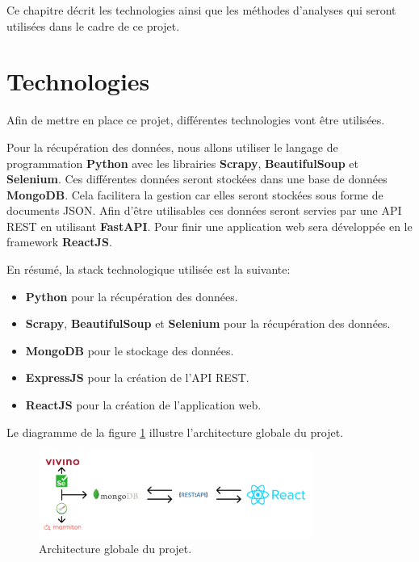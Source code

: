 Ce chapitre décrit les technologies ainsi que les méthodes d'analyses qui seront utilisées dans le cadre de ce projet.

\section{Technologies}

Afin de mettre en place ce projet, différentes technologies vont être utilisées.

Pour la récupération des données, nous allons utiliser le langage de programmation \textbf{Python} avec les librairies
\textbf{Scrapy}, \textbf{BeautifulSoup} et \textbf{Selenium}. Ces différentes données seront stockées dans une base de données \textbf{MongoDB}. 
Cela facilitera la gestion car elles seront stockées sous forme de documents JSON.
Afin d'être utilisables ces données seront servies par une API REST en utilisant \textbf{FastAPI}.
Pour finir une application web sera développée en le framework \textbf{ReactJS}.

En résumé, la stack technologique utilisée est la suivante: 
\begin{itemize}
    \item \textbf{Python} pour la récupération des données.
    \item \textbf{Scrapy}, \textbf{BeautifulSoup} et \textbf{Selenium} pour la récupération des données.
    \item \textbf{MongoDB} pour le stockage des données.
    \item \textbf{ExpressJS} pour la création de l'API REST.
    \item \textbf{ReactJS} pour la création de l'application web.
\end{itemize}   

Le diagramme de la figure \ref{fig:architecture} illustre l'architecture globale du projet.

\begin{figure}[H]
    \centering
    \includegraphics[width=0.8\textwidth]{rsc/architecture.png}
    \caption{Architecture globale du projet.}
    \label{fig:architecture}
\end{figure}


